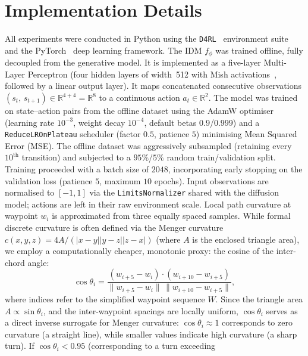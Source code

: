 \documentclass[12pt, a4paper, oneside]{report}
\theoremstyle{definition}
\newcommand{\R}{\mathbb{R}}
\begin{document}
\section{Implementation Details}
\label{sec:impl}

All experiments were conducted in Python using the
\texttt{D4RL}~\citep{fu2020d4rl} environment suite and the
PyTorch~\citep{paszke2019pytorch} deep learning framework.
The IDM $f_\phi$ was trained offline, fully decoupled from the generative model. It is implemented as a five-layer Multi-Layer Perceptron (four hidden layers of width~512 with Mish activations~\citep{misra2019mish}, followed by a linear output layer). It maps concatenated consecutive observations $(s_t,\, s_{t+1}) \in \R^{4+4} = \R^8$ to a continuous action $a_t \in \R^2$. The model was trained on state--action pairs from the offline dataset using the AdamW optimiser~\citep{kingma2014adam,loshchilov2019adamw} (learning rate $10^{-3}$, weight decay $10^{-4}$, default betas $0.9$/$0.999$) and a \texttt{ReduceLROnPlateau} scheduler (factor $0.5$, patience $5$) minimising Mean Squared Error (MSE). The offline dataset was aggressively subsampled (retaining every $10^{\mathrm{th}}$ transition) and subjected to a $95\%$/$5\%$ random train/validation split. Training proceeded with a batch size of $2048$, incorporating early stopping on the validation loss (patience $5$, maximum $10$ epochs). Input observations are normalised to $[-1,1]$ via the \texttt{LimitsNormalizer} shared with the diffusion model; actions
are left in their raw environment scale. Local path curvature at
waypoint $w_i$ is approximated from three equally spaced samples. While formal discrete curvature is often defined via the Menger curvature $c(x,y,z) = 4A / (|x-y||y-z||z-x|)$ (where $A$ is the enclosed triangle area), we employ a computationally cheaper, monotonic proxy: the cosine of the inter-chord angle:
\begin{equation}
  \cos\theta_i =
    \frac{(w_{i+5}-w_i)\cdot(w_{i+10}-w_{i+5})}
         {\|w_{i+5}-w_i\|\,\|w_{i+10}-w_{i+5}\|},
  \label{eq:curvature_approx}
\end{equation}
where indices refer to the simplified waypoint sequence $W$. Since the triangle area $A \propto \sin\theta_i$, and the inter-waypoint spacings are locally uniform, $\cos\theta_i$ serves as a direct inverse surrogate for Menger curvature: $\cos\theta_i \approx 1$ corresponds to zero curvature (a straight line), while smaller values indicate high curvature (a sharp turn). If
$\cos\theta_i < 0.95$ (corresponding to a turn exceeding
\end{document}
